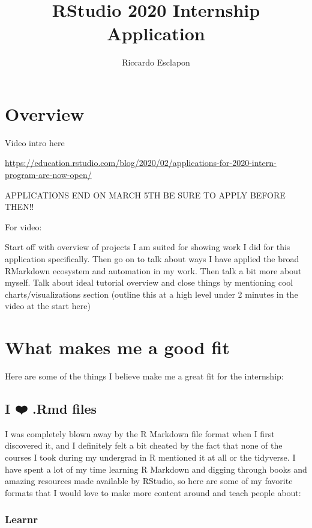 \documentclass[
]{book}
\title{RStudio 2020 Internship Application}
\author{Riccardo Esclapon}
\date{}
\begin{document}
\maketitle

{
\setcounter{tocdepth}{1}
\tableofcontents
}
\hypertarget{overview}{%
\chapter{Overview}\label{overview}}

Video intro here

\url{https://education.rstudio.com/blog/2020/02/applications-for-2020-intern-program-are-now-open/}

APPLICATIONS END ON MARCH 5TH BE SURE TO APPLY BEFORE THEN!!

For video:

Start off with overview of projects I am suited for showing work I did for this application specifically. Then go on to talk about ways I have applied the broad RMarkdown ecosystem and automation in my work. Then talk a bit more about myself. Talk about ideal tutorial overview and close things by mentioning cool charts/visualizations section (outline this at a high level under 2 minutes in the video at the start here)

\hypertarget{fit}{%
\chapter{What makes me a good fit}\label{fit}}

Here are some of the things I believe make me a great fit for the internship:

\hypertarget{i-uxfe0f-.rmd-files}{%
\section{I ❤️ .Rmd files}\label{i-uxfe0f-.rmd-files}}

I was completely blown away by the R Markdown file format when I first discovered it, and I definitely felt a bit cheated by the fact that none of the courses I took during my undergrad in R mentioned it at all or the tidyverse. I have spent a lot of my time learning R Markdown and digging through books and amazing resources made available by RStudio, so here are some of my favorite formats that I would love to make more content around and teach people about:

\hypertarget{learnr}{%
\subsection{Learnr}\label{learnr}}
\end{document}

